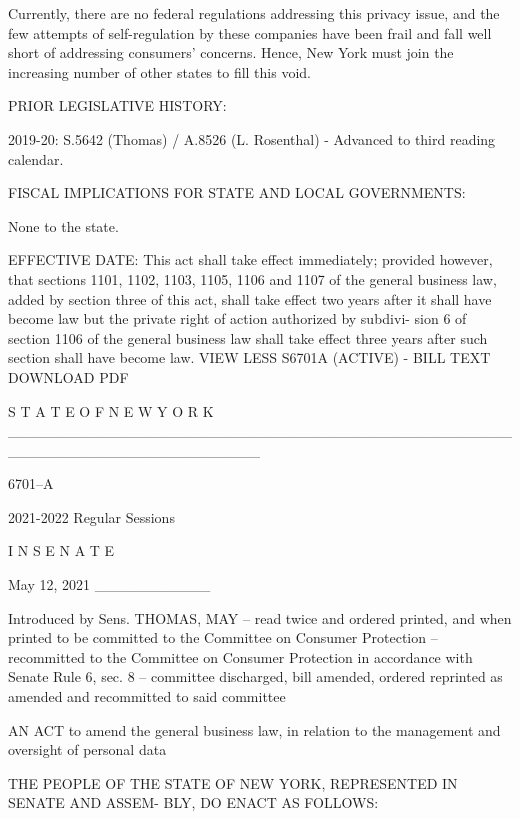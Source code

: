Currently, there are no federal regulations addressing this privacy
issue, and the few attempts of self-regulation by these companies have
been frail and fall well short of addressing consumers' concerns. Hence,
New York must join the increasing number of other states to fill this
void.

 
PRIOR LEGISLATIVE HISTORY:

2019-20: S.5642 (Thomas) / A.8526 (L. Rosenthal) - Advanced to third
reading calendar.

 
FISCAL IMPLICATIONS FOR STATE AND LOCAL GOVERNMENTS:

None to the state.

 
EFFECTIVE DATE:
This act shall take effect immediately; provided however, that sections
1101, 1102, 1103, 1105, 1106 and 1107 of the general business law, added
by section three of this act, shall take effect two years after it shall
have become law but the private right of action authorized by subdivi-
sion 6 of section 1106 of the general business law shall take effect
three years after such section shall have become law.
VIEW LESS
S6701A (ACTIVE) - BILL TEXT
DOWNLOAD PDF
 
                     S T A T E   O F   N E W   Y O R K
 ________________________________________________________________________
 
                                  6701--A
 
                        2021-2022 Regular Sessions
 
                             I N  S E N A T E
 
                               May 12, 2021
                                ___________
 
 Introduced  by  Sens. THOMAS, MAY -- read twice and ordered printed, and
   when printed to be committed to the Committee on  Consumer  Protection
   --  recommitted  to the Committee on Consumer Protection in accordance
   with Senate Rule 6, sec. 8  --  committee  discharged,  bill  amended,
   ordered reprinted as amended and recommitted to said committee

 AN  ACT to amend the general business law, in relation to the management
   and oversight of personal data
 
   THE PEOPLE OF THE STATE OF NEW YORK, REPRESENTED IN SENATE AND  ASSEM-
 BLY, DO ENACT AS FOLLOWS:
 
